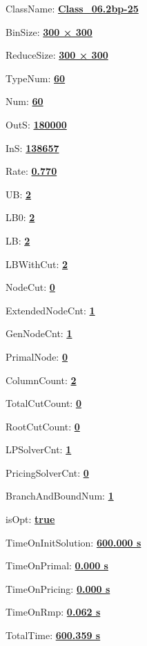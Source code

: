 \documentclass[11pt]{article}
\begin{document}
\pagestyle{empty}


ClassName: \underline{\textbf{Class_06.2bp-25}}
\par
BinSize: \underline{\textbf{300 × 300}}
\par
ReduceSize: \underline{\textbf{300 × 300}}
\par
TypeNum: \underline{\textbf{60}}
\par
Num: \underline{\textbf{60}}
\par
OutS: \underline{\textbf{180000}}
\par
InS: \underline{\textbf{138657}}
\par
Rate: \underline{\textbf{0.770}}
\par
UB: \underline{\textbf{2}}
\par
LB0: \underline{\textbf{2}}
\par
LB: \underline{\textbf{2}}
\par
LBWithCut: \underline{\textbf{2}}
\par
NodeCut: \underline{\textbf{0}}
\par
ExtendedNodeCnt: \underline{\textbf{1}}
\par
GenNodeCnt: \underline{\textbf{1}}
\par
PrimalNode: \underline{\textbf{0}}
\par
ColumnCount: \underline{\textbf{2}}
\par
TotalCutCount: \underline{\textbf{0}}
\par
RootCutCount: \underline{\textbf{0}}
\par
LPSolverCnt: \underline{\textbf{1}}
\par
PricingSolverCnt: \underline{\textbf{0}}
\par
BranchAndBoundNum: \underline{\textbf{1}}
\par
isOpt: \underline{\textbf{true}}
\par
TimeOnInitSolution: \underline{\textbf{600.000 s}}
\par
TimeOnPrimal: \underline{\textbf{0.000 s}}
\par
TimeOnPricing: \underline{\textbf{0.000 s}}
\par
TimeOnRmp: \underline{\textbf{0.062 s}}
\par
TotalTime: \underline{\textbf{600.359 s}}
\par
\newpage
\end{document}
